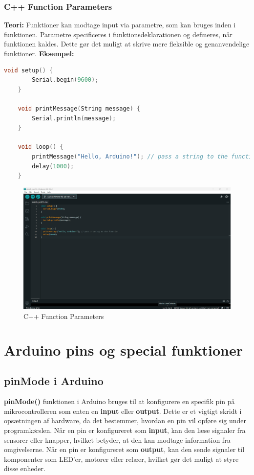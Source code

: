\subsection{C++ Function Parameters}
\textbf{Teori:} Funktioner kan modtage input via parametre, som kan bruges inden i funktionen. Parametre specificeres i funktionsdeklarationen og defineres, når funktionen kaldes. Dette gør det muligt at skrive mere fleksible og genanvendelige funktioner.
\newline\newline
\noindent\textbf{Eksempel:}
\begin{lstlisting}[language=C++]
	void setup() {
		Serial.begin(9600);
	}
	
	void printMessage(String message) {
		Serial.println(message);
	}
	
	void loop() {
		printMessage("Hello, Arduino!"); // pass a string to the function
		delay(1000);
	}
\end{lstlisting}
\begin{figure}[h!]
	\centering
	\includegraphics[width=\textwidth]{fig/fig12.png}
	\caption{C++ Function Parameters}
	\label{fig:12}
\end{figure}

\chapter{Arduino pins og special funktioner}
\section{pinMode i Arduino}
\textbf{pinMode()} funktionen i Arduino bruges til at konfigurere en specifik pin på mikrocontrolleren som enten en \textbf{input} eller \textbf{output}. Dette er et vigtigt skridt i opsætningen af hardware, da det bestemmer, hvordan en pin vil opføre sig under programkørslen. 
\newline\newline\noindent
Når en pin er konfigureret som \textbf{input}, kan den læse signaler fra sensorer eller knapper, hvilket betyder, at den kan modtage information fra omgivelserne. Når en pin er konfigureret som \textbf{output}, kan den sende signaler til komponenter som LED'er, motorer eller relæer, hvilket gør det muligt at styre disse enheder.

